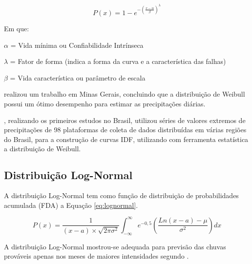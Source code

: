 \begin{equation}
\label{eq:weibull}
    P(x) = 1 - e^{-(\frac{x-\alpha}{\beta})^\lambda}
\end{equation}

Em que:

$\alpha$ = Vida mínima ou Confiabilidade Intrínseca

$\lambda$ = Fator de forma (indica a forma da curva e a característica das falhas)

$\beta$ = Vida característica ou parâmetro de escala \\


\par {} realizou um trabalho em Minas Gerais, concluindo que a distribuição de Weibull possui um ótimo desempenho para estimar as precipitações diárias.

, realizando os primeiros estudos no Brasil, utilizou séries de valores extremos de precipitações de 98 plataformas de coleta de dados distribuídas em várias regiões do Brasil, para a construção de curvas IDF, utilizando com ferramenta estatística a distribuição de Weibull.

\subsection{Distribuição Log-Normal}

A distribuição Log-Normal tem como função de distribuição de probabilidades acumulada (FDA) a Equação \ref{eq:lognormal}.

\begin{equation}
\label{eq:lognormal}
    P(x) = \frac{1}{(x-a) \times \sqrt{2\pi\sigma^2}} \int_{-\infty}^{\infty} e^{-0,5} \left( \frac{Ln(x-a)-\mu}{\sigma^2} \right) dx
\end{equation}

A distribuição Log-Normal mostrou-se adequada para previsão das chuvas prováveis apenas nos meses de maiores intensidades segundo .